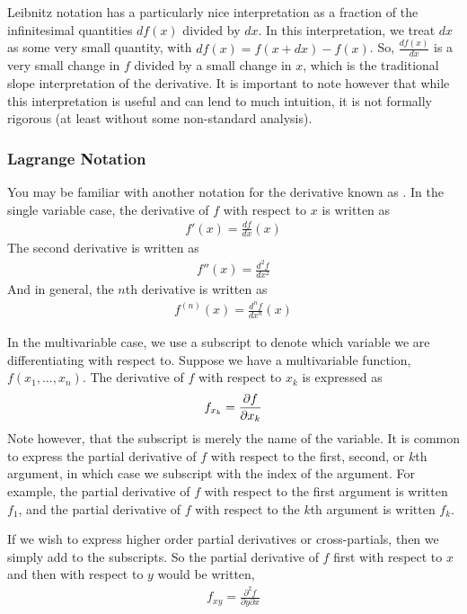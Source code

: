 Leibnitz notation has a particularly nice interpretation as a fraction of the infinitesimal quantities $df(x)$ divided by $dx$. In this interpretation, we treat $dx$ as some very small quantity, with $df(x) = f(x + dx) - f(x)$. So, $\frac{df(x)}{dx}$ is a very small change in $f$ divided by a small change in $x$, which is the traditional slope interpretation of the derivative. It is important to note however that while this interpretation is useful and can lend to much intuition, it is not formally rigorous (at least without some non-standard analysis). 

\subsubsection*{Lagrange Notation}
You may be familiar with another notation for the derivative known as . In the single variable case, the derivative of $f$ with respect to $x$ is written as
\begin{align*}
    f'(x) = \frac{df}{dx}(x)
\end{align*}
The second derivative is written as
\begin{align*}
    f''(x) = \frac{d^2f}{dx^2}
\end{align*}
And in general, the $n$th derivative is written as
\begin{align*}
    f^{(n)}(x) = \frac{d^nf}{dx^n}(x)
\end{align*}

In the multivariable case, we use a subscript to denote which variable we are differentiating with respect to. Suppose we have a multivariable function, $f(x_1, \dots, x_n)$. The derivative of $f$ with respect to $x_k$ is expressed as
\begin{align*}
    f_{x_k} = \frac{\partial f}{\partial x_k}
\end{align*}
Note however, that the subscript is merely the name of the variable. It is common to express the partial derivative of $f$ with respect to the first, second, or $k$th argument, in which case we subscript with the index of the argument. For example, the partial derivative of $f$ with respect to the first argument is written $f_1$, and the partial derivative of $f$ with respect to the $k$th argument is written $f_k$. 

If we wish to express higher order partial derivatives or cross-partials, then we simply add to the subscripts. So the partial derivative of $f$ first with respect to $x$ and then with respect to $y$ would be written,
\begin{align*}
    f_{xy} = \frac{\partial^2 f}{\partial y \partial x}
\end{align*}

